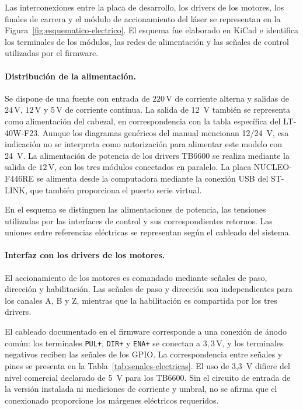 \documentclass[blue,fullpaper]{ludusofficial}  %
\begin{document}
Las interconexiones entre la placa de desarrollo,
los drivers de los motores, los finales de carrera
y el módulo de accionamiento del láser se representan
en la Figura~\ref{fig:esquematico-electrico}.
El esquema fue elaborado en KiCad e identifica
los terminales de los módulos, las redes de alimentación
y las señales de control utilizadas por el firmware.

\paragraph{Distribución de la alimentación.}
Se dispone de una fuente con entrada de
$220\,\mathrm{V}$ de corriente alterna y salidas de
$24\,\mathrm{V}$, $12\,\mathrm{V}$ y $5\,\mathrm{V}$ de corriente continua.
La salida de 12~V también se representa como alimentación del cabezal, en correspondencia con la tabla específica del LT-40W-F23. Aunque los diagramas genéricos del manual mencionan 12/24~V, esa indicación no se interpreta como autorización para alimentar este modelo con 24~V.
La alimentación de potencia de los drivers TB6600
se realiza mediante la salida de $12\,\mathrm{V}$,
con los tres módulos conectados en paralelo.
La placa NUCLEO-F446RE se alimenta desde la computadora mediante la conexión USB del ST-LINK, que también proporciona el puerto serie virtual.

En el esquema se distinguen las alimentaciones
de potencia, las tensiones utilizadas por las
interfaces de control y sus correspondientes retornos.
Las uniones entre referencias eléctricas se representan
según el cableado del sistema.

\paragraph{Interfaz con los drivers de los motores.}
El accionamiento de los motores es comandado mediante
señales de paso, dirección y habilitación.
Las señales de paso y dirección son independientes
para los canales A, B y Z, mientras que la habilitación
es compartida por los tres drivers.

El cableado documentado en el firmware corresponde
a una conexión de ánodo común: los terminales
\texttt{PUL+}, \texttt{DIR+} y \texttt{ENA+}
se conectan a $3{,}3\,\mathrm{V}$, y los terminales
negativos reciben las señales de los GPIO.
La correspondencia entre señales y pines se presenta en la Tabla~\ref{tab:senales-electricas}. El uso de 3,3~V difiere del nivel comercial declarado de 5~V para los TB6600. Sin el circuito de entrada de la versión instalada ni mediciones de corriente y umbral, no se afirma que el conexionado proporcione los márgenes eléctricos requeridos.
\end{document}
